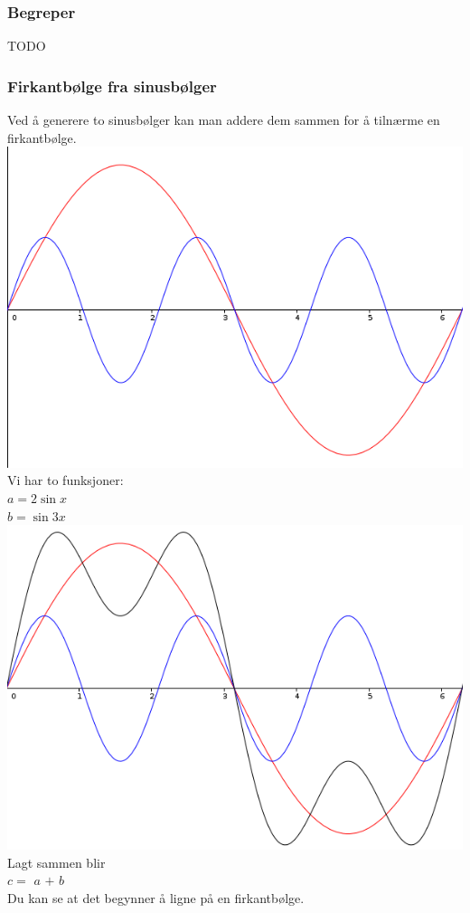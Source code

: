 \subsubsection{Begreper}
TODO

\subsubsection{Firkantbølge fra sinusbølger}
Ved å generere to sinusbølger
kan man addere dem sammen for å tilnærme en firkantbølge.
\\
\includegraphics[width=\textwidth]{./img/harmoni-ab}
Vi har to funksjoner: \\
{\color{red} $a = 2\sin{x}$} \\
{\color{blue} $b = \sin{3x}$}
\\
\includegraphics[width=\textwidth]{./img/harmoni-abc}
Lagt sammen blir \\
$c = $ {\color{red} $a$} $+$ {\color{blue} $b$} \\
Du kan se at det begynner å ligne på en firkantbølge.
